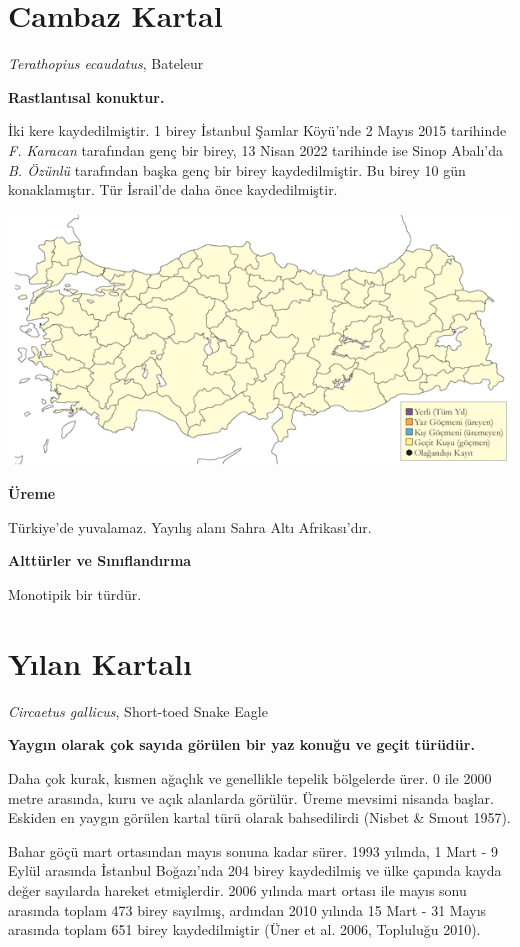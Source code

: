 \documentclass[
  letterpaper,
  DIV=11,
  numbers=noendperiod]{scrreprt}
\begin{document}
\section{Cambaz Kartal}\label{cambaz-kartal}

\emph{Terathopius ecaudatus}, Bateleur

\textbf{Rastlantısal konuktur.}

İki kere kaydedilmiştir. 1 birey İstanbul Şamlar Köyü'nde 2 Mayıs 2015
tarihinde \emph{F. Karacan} tarafından genç bir birey, 13 Nisan 2022
tarihinde ise Sinop Abalı'da \emph{B. Özünlü} tarafından başka genç bir
birey kaydedilmiştir. Bu birey 10 gün konaklamıştır. Tür İsrail'de daha
önce kaydedilmiştir.

\includegraphics{images/harita_Page_090.png}

\textbf{Üreme}

Türkiye'de yuvalamaz. Yayılış alanı Sahra Altı Afrikası'dır.

\textbf{Alttürler ve Sınıflandırma}

Monotipik bir türdür.

\section{Yılan Kartalı}\label{yux131lan-kartalux131}

\emph{Circaetus gallicus}, Short-toed Snake Eagle

\textbf{Yaygın olarak çok sayıda görülen bir yaz konuğu ve geçit
türüdür.}

Daha çok kurak, kısmen ağaçlık ve genellikle tepelik bölgelerde ürer. 0
ile 2000 metre arasında, kuru ve açık alanlarda görülür. Üreme mevsimi
nisanda başlar. Eskiden en yaygın görülen kartal türü olarak
bahsedilirdi (Nisbet \& Smout 1957).

Bahar göçü mart ortasından mayıs sonuna kadar sürer. 1993 yılında, 1
Mart - 9 Eylül arasında İstanbul Boğazı'nda 204 birey kaydedilmiş ve
ülke çapında kayda değer sayılarda hareket etmişlerdir. 2006 yılında
mart ortası ile mayıs sonu arasında toplam 473 birey sayılmış, ardından
2010 yılında 15 Mart - 31 Mayıs arasında toplam 651 birey kaydedilmiştir
(Üner et al. 2006, Topluluğu 2010).
\end{document}
